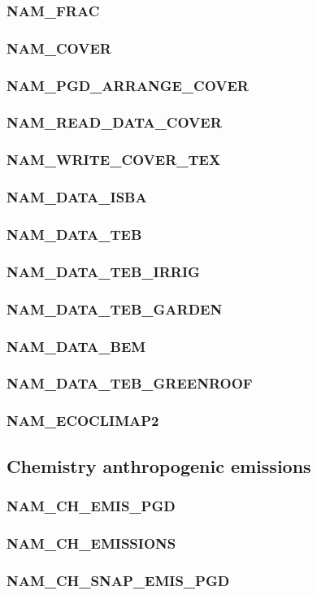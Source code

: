 \subsubsection{NAM\_FRAC}
\subsubsection{NAM\_COVER}
\subsubsection{NAM\_PGD\_ARRANGE\_COVER}
\subsubsection{NAM\_READ\_DATA\_COVER}
\subsubsection{NAM\_WRITE\_COVER\_TEX}
\subsubsection{NAM\_DATA\_ISBA}
\subsubsection{NAM\_DATA\_TEB}
\subsubsection{NAM\_DATA\_TEB\_IRRIG}
\subsubsection{NAM\_DATA\_TEB\_GARDEN}
\subsubsection{NAM\_DATA\_BEM}
\subsubsection{NAM\_DATA\_TEB\_GREENROOF}
\subsubsection{NAM\_ECOCLIMAP2}

\newpage
\subsection{Chemistry anthropogenic emissions}
\subsubsection{NAM\_CH\_EMIS\_PGD}
\subsubsection{NAM\_CH\_EMISSIONS}
\subsubsection{NAM\_CH\_SNAP\_EMIS\_PGD}
